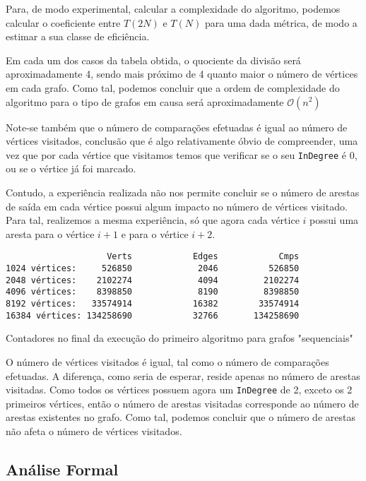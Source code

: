 Para, de modo experimental, calcular a complexidade do algoritmo,
podemos calcular o coeficiente entre $T(2N)$ e $T(N)$ para uma dada métrica, de modo a
estimar a sua classe de eficiência.

Em cada um dos casos da tabela obtida, o quociente da divisão
será aproximadamente 4, sendo mais próximo de 4 quanto maior o
número de vértices em cada grafo. Como tal, podemos concluir que
a ordem de complexidade do algoritmo para o tipo de grafos em
causa será aproximadamente $\mathcal{O}(n^2)$

Note-se também que o número de comparações efetuadas é igual ao
número de vértices visitados, conclusão que é algo relativamente
óbvio de compreender, uma vez que por cada vértice que visitamos
temos que verificar se o seu \verb|InDegree| é 0, ou se o vértice
já foi marcado.

Contudo, a experiência realizada não nos permite concluir se o
número de arestas de saída em cada vértice possui algum impacto
no número de vértices visitado. Para tal, realizemos a mesma
experiência, só que agora cada vértice $i$ possui uma aresta para
o vértice $i + 1$ e para o vértice $i + 2$.

\begin{listing}[H]
\centering
\begin{verbatim}
                    Verts	         Edges	          Cmps
1024 vértices:     526850	          2046	        526850
2048 vértices:    2102274	          4094	       2102274
4096 vértices:    8398850	          8190	       8398850
8192 vértices:   33574914	         16382	      33574914
16384 vértices: 134258690	         32766	     134258690
\end{verbatim}
\caption{Contadores no final da execução do primeiro algoritmo
para grafos "sequenciais"}
\end{listing}

O número de vértices visitados é igual, tal como o número de
comparações efetuadas. A diferença, como seria de esperar, reside
apenas no número de arestas visitadas. Como todos os vértices
possuem agora um \verb|InDegree| de 2, exceto os 2 primeiros
vértices, então o número de arestas visitadas corresponde ao
número de arestas existentes no grafo. Como tal, podemos concluir
que o número de arestas não afeta o número de vértices visitados.

\subsection{Análise Formal}

